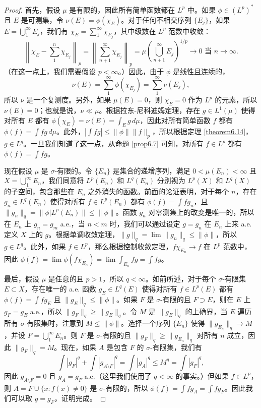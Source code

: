 \documentclass[lang=cn,10pt,thmcnt=section]{elegantbook}
\begin{document}
\begin{proof}
首先，假设 $\mu$ 是有限的，因此所有简单函数都在 $L^p$ 中。如果 $\phi \in (L^p)^*$ 且 $E$ 是可测集，令 $\nu(E) = \phi(\chi_E)$。对于任何不相交序列 $\{E_j\}$，如果 $E = \bigcup_1^\infty E_j$，我们有 $\chi_E = \sum_1^\infty \chi_{E_j}$，其中级数在 $L^p$ 范数中收敛：
\[ \left\|\chi_E - \sum_1^n \chi_{E_j}\right\|_p = \left\|\sum_{n+1}^\infty \chi_{E_j}\right\|_p = \mu\left(\bigcup_{n+1}^\infty E_j\right)^{1/p} \to 0 \text{ 当 } n \to \infty. \]
（在这一点上，我们需要假设 $p < \infty$。）因此，由于 $\phi$ 是线性且连续的，
\[ \nu(E) = \sum_1^\infty \phi(\chi_{E_j}) = \sum_1^\infty \nu(E_j), \]
所以 $\nu$ 是一个复测度。另外，如果 $\mu(E) = 0$，则 $\chi_E = 0$ 作为 $L^p$ 的元素，所以 $\nu(E) = 0$；也就是说，$\nu \ll \mu$。根据拉东-尼科迪姆定理，存在 $g \in L^1(\mu)$ 使得对所有 $E$ 都有 $\phi(\chi_E) = \nu(E) = \int_E g\,d\mu$，因此对所有简单函数 $f$ 都有 $\phi(f) = \int fg\,d\mu$。此外，$|\int fg| \leq \|\phi\| \|f\|_p$，所以根据定理 \ref{theorem6.14}，$g \in L^q$。一旦我们知道了这一点，从命题 \ref{prop6.7} 可知，对所有 $f \in L^p$ 都有 $\phi(f) = \int fg$。

现在假设 $\mu$ 是 $\sigma$-有限的。令 $\{E_n\}$ 是集合的递增序列，满足 $0 < \mu(E_n) < \infty$ 且 $X = \bigcup_1^\infty E_n$，我们同意将 $L^p(E_n)$ 和 $L^q(E_n)$ 分别视为 $L^p(X)$ 和 $L^q(X)$ 的子空间，包含那些在 $E_n$ 之外消失的函数。前面的论证表明，对于每个 $n$，存在 $g_n \in L^q(E_n)$ 使得对所有 $f \in L^p(E_n)$ 都有 $\phi(f) = \int fg_n$，且 $\|g_n\|_q = \|\phi|L^p(E_n)\| \leq \|\phi\|$。函数 $g_n$ 对零测集上的改变是唯一的，所以在 $E_n$ 上 $g_n = g_m$ a.e.，当 $n < m$ 时，我们可以通过设定 $g = g_n$ 在 $E_n$ 上来 a.e. 定义 $X$ 上的 $g$。根据单调收敛定理，$\|g\|_q = \lim \|g_n\|_q \leq \|\phi\|$，所以 $g \in L^q$。此外，如果 $f \in L^p$，那么根据控制收敛定理，$f\chi_{E_n} \to f$ 在 $L^p$ 范数中，因此 $\phi(f) = \lim \phi(f\chi_{E_n}) = \lim \int_{E_n} fg = \int fg$。

最后，假设 $\mu$ 是任意的且 $p > 1$，所以 $q < \infty$。如前所述，对于每个 $\sigma$-有限集 $E \subset X$，存在唯一的 a.e. 函数 $g_E \in L^q(E)$ 使得对所有 $f \in L^p(E)$ 都有 $\phi(f) = \int fg_E$ 且 $\|g_E\|_q \leq \|\phi\|$。如果 $F$ 是 $\sigma$-有限的且 $F \supset E$，则在 $E$ 上 $g_F = g_E$ a.e.，所以 $\|g_F\|_q \geq \|g_E\|_q$。令 $M$ 是 $\|g_E\|_q$ 的上确界，当 $E$ 遍历所有 $\sigma$-有限集时，注意到 $M \leq \|\phi\|$。选择一个序列 $\{E_n\}$ 使得 $\|g_{E_n}\|_q \to M$，并设 $F = \bigcup_1^\infty E_n$。则 $F$ 是 $\sigma$-有限的且 $\|g_F\|_q \geq \|g_{E_n}\|_q$ 对所有 $n$ 成立，因此 $\|g_F\|_q = M$。现在，如果 $A$ 是包含 $F$ 的 $\sigma$-有限集，我们有
\[ \int |g_F|^q + \int |g_{A\setminus F}|^q = \int |g_A|^q \leq M^q = \int |g_F|^q, \]
因此 $g_{A\setminus F} = 0$ 且 $g_A = g_F$ a.e.（这里我们使用了 $q < \infty$ 的事实。）但如果 $f \in L^p$，则 $A = F \cup \{x : f(x) \neq 0\}$ 是 $\sigma$-有限的，所以 $\phi(f) = \int fg_A = \int fg_F$。因此我们可以取 $g = g_F$，证明完成。
\end{proof}
\end{document}

